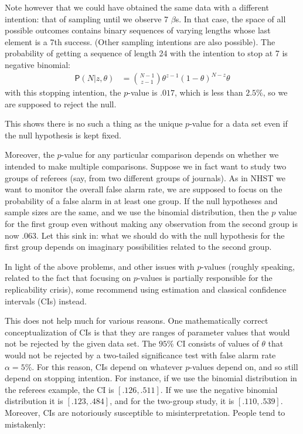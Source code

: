 Note however that we could have obtained the same data with a different intention: that of sampling until we observe 7 $\beta$s. In that case, the space of all possible outcomes contains binary sequences of varying lengths whose last element is a 7th success. (Other sampling intentions are also possible). The probability of getting a sequence of length 24 with the intention to stop at 7 is negative binomial:
  \begin{align*}
\mathsf{P}(N\vert z, \theta) & = {N- 1 \choose z - 1}\theta^{z-1}(1-\theta)^{N - z}\theta
\end{align*}
\noindent with this stopping intention, the $p$-value is $.017$, which is less than $2.5\%$, so we are supposed to reject the null.


This shows there is no such a thing as the unique $p$-value for a data set even if the null hypothesis is kept fixed. 




Moreover, the $p$-value for any particular comparison depends on whether we intended to make multiple comparisons. Suppose we in fact want to study two groups of referees (say, from two different groups of journals). As in NHST we want to monitor the overall false alarm rate, we are supposed to focus on the probability of a false alarm in at least one group. If the null hypotheses and sample sizes are the same, and we use the binomial distribution, then the $p$ value for the first group even without making any observation from the second group is now $.063$. Let this sink in: what we should do with the null hypothesis for the first group depends on imaginary possibilities related to the second group.


In light of the above problems, and other issues with $p$-values (roughly speaking, related to the fact that focusing on $p$-values is partially responsible for the replicability crisis), some recommend using estimation and classical confidence intervals (CIs) instead. 

This does not help much for various reasons.  One mathematically correct conceptualization of CIs is that they are ranges of parameter values that would not be rejected by the given data set. The $95\%$ CI consists of values of $\theta$ that would not be rejected by a two-tailed significance test with false alarm rate $\alpha = 5\%$. For this reason, CIs depend on whatever $p$-values depend on, and so still depend on stopping intention. For instance, if we use the binomial distribution in the referees example, the CI is $[.126,.511]$. If we use the negative binomial distribution it is $[.123,.484]$, and for the two-group study, it is $[.110, .539]$. Moreover, CIs are notoriously susceptible to misinterpretation. People tend to mistakenly:
  
